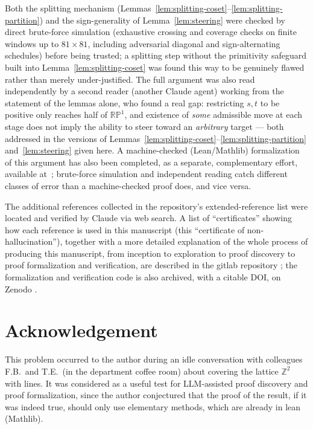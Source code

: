 \documentclass[a4paper,11pt,oneside,reqno]{amsart}
\theoremstyle{definition}
\theoremstyle{remark}
\theoremstyle{plain}
\newcommand{\Z}{\mathbb{Z}}
\newcommand{\RP}{\mathbb{RP}^1}
\begin{document}
Both the splitting mechanism (Lemmas~\ref{lem:splitting-coset}--\ref{lem:splitting-partition}) and
the sign-generality of Lemma~\ref{lem:steering} were checked by direct brute-force simulation
(exhaustive crossing and coverage checks on finite windows up to \(81\times81\), including
adversarial diagonal and sign-alternating schedules) before being trusted; a splitting step
without the primitivity safeguard built into Lemma~\ref{lem:splitting-coset} was found this way to
be genuinely flawed rather than merely under-justified. The full argument was also read
independently by a second reader (another Claude agent) working from the statement of the lemmas
alone, who found a real gap: restricting \(s,t\) to be positive only reaches half of \(\RP\), and
existence of \emph{some} admissible move at each stage does not imply the ability to steer toward
an \emph{arbitrary} target --- both addressed in the versions of
Lemmas~\ref{lem:splitting-coset}--\ref{lem:splitting-partition} and~\ref{lem:steering} given here.
A machine-checked (Lean/Mathlib) formalization of this argument has also been completed, as a
separate, complementary effort, available at~\cite{gitrepo}; brute-force simulation and
independent reading catch different classes of error than a machine-checked proof does, and vice
versa.

The additional references collected in the repository's extended-reference list \cite{gitrepo}
were located and verified by Claude via web search. A list of ``certificates'' showing how each
reference is used in this manuscript (this ``certificate of non-hallucination''), together with a
more detailed explanation of the whole process of producing this manuscript, from inception to
exploration to proof discovery to proof formalization and verification, are described in the
gitlab repository \cite{gitrepo}; the formalization and verification code is also archived, with a
citable DOI, on Zenodo \cite{zenodo}.

\section*{Acknowledgement}

This problem occurred to the author during an idle conversation with colleagues
F.B.\ and T.E.\ (in the department coffee room) about covering the lattice \(\Z^2\) with lines.
It was considered as a useful test for LLM-assisted proof discovery and proof
formalization, since the author conjectured that the proof of the result,
if it was indeed true, should only use elementary methods, which are already in
lean (Mathlib).
\end{document}
